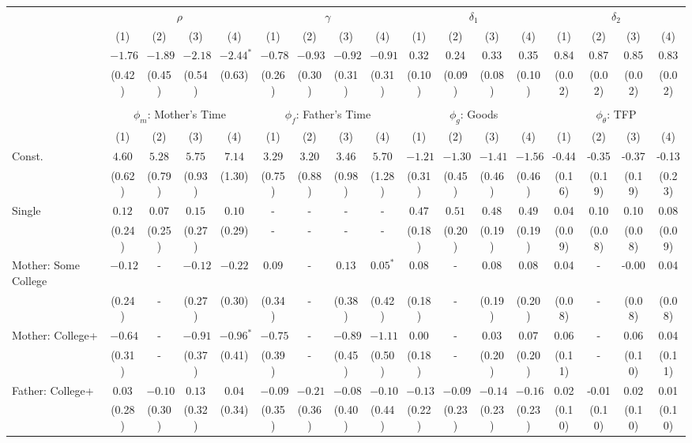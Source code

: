 \begin{tabular}{lcccccccccccccccc}\\\toprule
 & \multicolumn{4}{c}{$\rho$} & \multicolumn{4}{c}{$\gamma$} & \multicolumn{4}{c}{$\delta_{1}$} & \multicolumn{4}{c}{$\delta_{2}$} \\
&(1)&(2)&(3)&(4)&(1)&(2)&(3)&(4)&(1)&(2)&(3)&(4)&(1)&(2)&(3)&(4)\\\cmidrule(r){2-5}\cmidrule(r){6-9}\cmidrule(r){10-13}\cmidrule(r){14-17}
&$-1.76$&$-1.89$&$-2.18$&$-2.44^{*}$&$-0.78$&$-0.93$&$-0.92$&$-0.91$&0.32&0.24&0.33&0.35&0.84&0.87&0.85&0.83\\
&(0.42)&(0.45)&(0.54)&(0.63)&(0.26)&(0.30)&(0.31)&(0.31)&(0.10)&(0.09)&(0.08)&(0.10)&(0.02)&(0.02)&(0.02)&(0.02)\\
&&&&&&&&&&&&&&&&\\
 & \multicolumn{4}{c}{$\phi_{m}$: Mother's Time} & \multicolumn{4}{c}{$\phi_{f}$: Father's Time} & \multicolumn{4}{c}{$\phi_{g}$: Goods} & \multicolumn{4}{c}{$\phi_{\theta}$: TFP} \\
&(1)&(2)&(3)&(4)&(1)&(2)&(3)&(4)&(1)&(2)&(3)&(4)&(1)&(2)&(3)&(4)\\\cmidrule(r){2-5}\cmidrule(r){6-9}\cmidrule(r){10-13}\cmidrule(r){14-17}
Const.&$4.60$&$5.28$&$5.75$&$7.14$&$3.29$&$3.20$&$3.46$&$5.70$&$-1.21$&$-1.30$&$-1.41$&$-1.56$&-0.44&-0.35&-0.37&-0.13\\
&(0.62)&(0.79)&(0.93)&(1.30)&(0.75)&(0.88)&(0.98)&(1.28)&(0.31)&(0.45)&(0.46)&(0.46)&(0.16)&(0.19)&(0.19)&(0.23)\\
Single&$0.12$&$0.07$&$0.15$&$0.10$&-&-&-&-&$0.47$&$0.51$&$0.48$&$0.49$&0.04&0.10&0.10&0.08\\
&(0.24)&(0.25)&(0.27)&(0.29)&-&-&-&-&(0.18)&(0.20)&(0.19)&(0.19)&(0.09)&(0.08)&(0.08)&(0.09)\\
Mother: Some College&$-0.12$&-&$-0.12$&$-0.22$&$0.09$&-&$0.13$&$0.05^{*}$&$0.08$&-&$0.08$&$0.08$&0.04&-&-0.00&0.04\\
&(0.24)&-&(0.27)&(0.30)&(0.34)&-&(0.38)&(0.42)&(0.18)&-&(0.19)&(0.20)&(0.08)&-&(0.08)&(0.08)\\
Mother: College+&$-0.64$&-&$-0.91$&$-0.96^{*}$&$-0.75$&-&$-0.89$&$-1.11$&$0.00$&-&$0.03$&$0.07$&0.06&-&0.06&0.04\\
&(0.31)&-&(0.37)&(0.41)&(0.39)&-&(0.45)&(0.50)&(0.18)&-&(0.20)&(0.20)&(0.11)&-&(0.10)&(0.11)\\
Father: College+&$0.03$&$-0.10$&$0.13$&$0.04$&$-0.09$&$-0.21$&$-0.08$&$-0.10$&$-0.13$&$-0.09$&$-0.14$&$-0.16$&0.02&-0.01&0.02&0.01\\
&(0.28)&(0.30)&(0.32)&(0.34)&(0.35)&(0.36)&(0.40)&(0.44)&(0.22)&(0.23)&(0.23)&(0.23)&(0.10)&(0.10)&(0.10)&(0.10)\\

\end{tabular}
